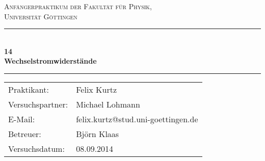 \documentclass[12pt,a4paper,titlepage,headinclude,bibtotoc]{scrartcl}
\begin{document}
\begin{titlepage}
\centering
\textsc{\Large Anfängerpraktikum der Fakultät für
  Physik,\\[1.5ex] Universität Göttingen}

\vspace*{4.2cm}

\rule{\textwidth}{1pt}\\[0.5cm]
{\huge \bfseries
  14\\[1.5ex]
  Wechselstromwiderstände}\\[0.5cm]
\rule{\textwidth}{1pt}

\vspace*{2.5cm}

\begin{Large}
\begin{tabular}{ll}
Praktikant: & Felix Kurtz\\
Versuchspartner: & Michael Lohmann\\
 E-Mail: &  felix.kurtz@stud.uni-goettingen.de\\
 Betreuer: & Björn Klaas\\
 Versuchsdatum: & 08.09.2014\\
\end{tabular}
\end{Large}

\vspace*{0.8cm}

\begin{Large}
\end{Large}

\end{titlepage}

\tableofcontents

\newpage
\end{document}
